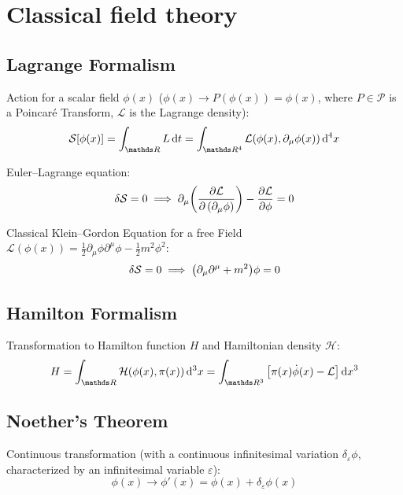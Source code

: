 \section{Classical field theory}
	\subsection{Lagrange Formalism}
		\noindent
		Action for a scalar field $\phi(x)$ (\ie $\phi(x)\to P(\phi(x))=\phi(x)$, where $P\in\mathcal{P}$ is a Poincaré Transform, $\mathcal{L}$ is the Lagrange density):
		\begin{equation}
			\mathcal{S}\qty[\phi(x)] = \int_{\reals } L \dd{t} = \int_{\reals ^4} \mathcal{L}(\phi(x),\partial_\mu \phi(x)) \dd[4]{x}
		\end{equation}

		\noindent
		Euler--Lagrange equation:
		\begin{equation}
			\delta\mathcal{S} = 0
			\implies \partial_\mu \qty(\pdv{\mathcal{L}}{\left(\partial_\mu \phi\right)}) - \pdv{\mathcal{L}}{\phi} = 0
		\end{equation}

		\noindent
		Classical Klein--Gordon Equation for a free Field $\mathcal{L}(\phi(x)) = \frac{1}{2} \partial_\mu \phi \partial^\mu \phi - \frac{1}{2} m^2 \phi^2$:
		\begin{equation}
			\delta \mathcal{S} = 0 \implies \qty(\partial_\mu \partial^\mu + m^2)\phi = 0
		\end{equation}


	\subsection{Hamilton Formalism}
		\noindent
		Transformation to Hamilton function $H$ and Hamiltonian density $\mathcal{H}$:
		\begin{equation}
			H = \int_{\reals } \mathcal{H}(\phi(x),\pi(x)) \dd[3]{x}= \int_{\reals ^3} \qty[\pi(x)\dot{\phi}(x) - \mathcal{L}] \dd{x}^3
		\end{equation}

	\subsection{Noether's Theorem}
		\noindent
		Continuous transformation (with a continuous infinitesimal variation $\delta_\varepsilon \phi$, characterized by an infinitesimal variable $\varepsilon$):
		\begin{equation}
			\phi(x)\to\phi'(x) = \phi(x) + \delta_\varepsilon \phi(x)
		\end{equation}

